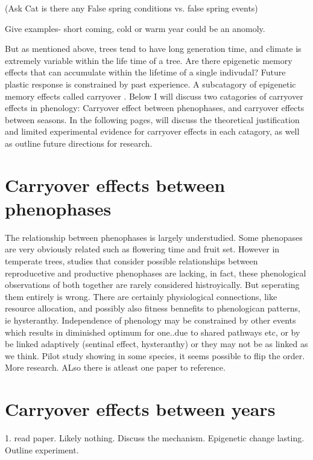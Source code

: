 \documentclass{article}\usepackage[]{graphicx}\usepackage[]{color}
\begin{document}
(Ask Cat is there any False spring conditions vs. false spring events)

Give examples-
short coming, cold or warm year could be an anomoly.
\par But as mentioned above, trees tend to have long generation time, and climate is extremely variable within the life time of a tree. Are there epigenetic memory effects that can accumulate within the lifetime of a single indivudal? Future plastic response is constrained by past experience. A subcatagory of epigenetic memory effects called carryover \citep{O'Connor2014}. Below I will discuss two catagories of carryover effects in phenology: Carryover effect between phenophases, and carryover effects between seasons. In the following pages, will discuss the theoretical justification and limited experimental evidence for carryover effects in each catagory, as well as outline future directions for research.
\section{Carryover effects between phenophases}
The relationship between phenophases is largely understudied. Some phenopases are very obviously related such as flowering time and fruit set. However in temperate trees, studies that consider possible relationships between reproducetive and productive phenophases are lacking, in fact, these phenological observations of both together are rarely considered histroyically. But seperating them entirely is wrong. There are certainly physiological connections, like resource allocation, and possibly also fitness bennefits to phenologican patterns, ie hysteranthy. Independence of phenology may be constrained by other events which results in diminished optimum for one..due to shared pathways etc, or by be linked adaptively (sentinal effect, hysteranthy) or they may not be as linked as we think. Pilot study showing in some species, it seems possible to flip the order. More research. ALso there is atleast one paper to reference.
\section{Carryover effects between years}
1. read paper. Likely nothing. Discuss the mechanism. Epigenetic change lasting. Outline experiment.
\end{document}
